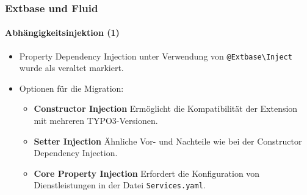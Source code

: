 %

\begin{frame}[fragile]
	\frametitle{Extbase und Fluid}
	\framesubtitle{Abhängigkeitsinjektion (1)}


	\begin{itemize}
		\item Property Dependency Injection unter Verwendung von
			\small\texttt{@Extbase\textbackslash Inject}\normalsize\newline
			wurde als veraltet markiert.

		\item Optionen für die Migration:

			\begin{itemize}\small
				\item \textbf{Constructor Injection}\newline
				 	Ermöglicht die Kompatibilität der Extension mit mehreren TYPO3-Versionen.
				\item \textbf{Setter Injection}\newline
					Ähnliche Vor- und Nachteile wie bei der Constructor Dependency Injection.
				\item \textbf{Core Property Injection}\newline
					Erfordert die Konfiguration von Dienstleistungen in der Datei \texttt{Services.yaml}.
			\end{itemize}\normalsize

	\end{itemize}

\end{frame}

